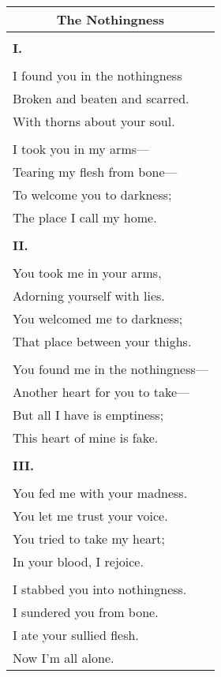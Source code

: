 \documentclass{article}
\begin{document}
\newcommand{\h}{\hspace*{2ex}}
\newcommand{\hh}{\hspace*{4ex}}
\newcommand{\hhh}{\hspace*{6ex}}

\begin{center}
\begin{tabular}{l}
\multicolumn{1}{c}{\textbf{The Nothingness}} \\\hline
\\
\textbf{I.} \\
\\
I found you in the nothingness \\
\h{}Broken and beaten and scarred. \\
\hh{}With thorns about your soul. \\
\\
I took you in my arms--- \\
\h{}Tearing my flesh from bone--- \\
\hh{}To welcome you to darkness; \\
\hhh{}The place I call my home. \\
\\
\textbf{II.} \\
\\
You took me in your arms, \\
\h{}Adorning yourself with lies. \\
\hh{}You welcomed me to darkness; \\
\hhh{}That place between your thighs. \\
\\
You found me in the nothingness--- \\
\h{}Another heart for you to take--- \\
\hh{}But all I have is emptiness; \\
\hhh{}This heart of mine is fake. \\
\\
\textbf{III.} \\
\\
You fed me with your madness. \\
\h{}You let me trust your voice. \\
\hh{}You tried to take my heart; \\
\hhh{}In your blood, I rejoice. \\
\\
I stabbed you into nothingness. \\
\h{}I sundered you from bone. \\
\hh{}I ate your sullied flesh. \\
\hhh{}Now I'm all alone. \\
\end{tabular}
\end{center}
\end{document}

